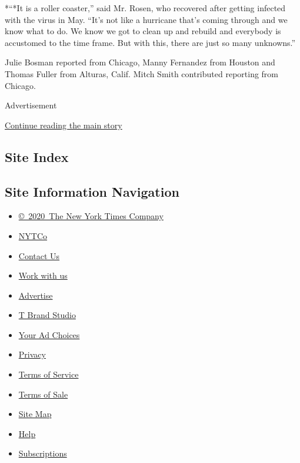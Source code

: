 *``*It is a roller coaster,'' said Mr. Rosen, who recovered after
getting infected with the virus in May. ``It's not like a hurricane
that's coming through and we know what to do. We know we got to clean up
and rebuild and everybody is accustomed to the time frame. But with
this, there are just so many unknowns.''

Julie Bosman reported from Chicago, Manny Fernandez from Houston and
Thomas Fuller from Alturas, Calif. Mitch Smith contributed reporting
from Chicago.

Advertisement

\protect\hyperlink{after-bottom}{Continue reading the main story}

\hypertarget{site-index}{%
\subsection{Site Index}\label{site-index}}

\hypertarget{site-information-navigation}{%
\subsection{Site Information
Navigation}\label{site-information-navigation}}

\begin{itemize}
\tightlist
\item
  \href{https://help.nytimes.com/hc/en-us/articles/115014792127-Copyright-notice}{©~2020~The
  New York Times Company}
\end{itemize}

\begin{itemize}
\tightlist
\item
  \href{https://www.nytco.com/}{NYTCo}
\item
  \href{https://help.nytimes.com/hc/en-us/articles/115015385887-Contact-Us}{Contact
  Us}
\item
  \href{https://www.nytco.com/careers/}{Work with us}
\item
  \href{https://nytmediakit.com/}{Advertise}
\item
  \href{http://www.tbrandstudio.com/}{T Brand Studio}
\item
  \href{https://www.nytimes.com/privacy/cookie-policy\#how-do-i-manage-trackers}{Your
  Ad Choices}
\item
  \href{https://www.nytimes.com/privacy}{Privacy}
\item
  \href{https://help.nytimes.com/hc/en-us/articles/115014893428-Terms-of-service}{Terms
  of Service}
\item
  \href{https://help.nytimes.com/hc/en-us/articles/115014893968-Terms-of-sale}{Terms
  of Sale}
\item
  \href{https://spiderbites.nytimes.com}{Site Map}
\item
  \href{https://help.nytimes.com/hc/en-us}{Help}
\item
  \href{https://www.nytimes.com/subscription?campaignId=37WXW}{Subscriptions}
\end{itemize}
